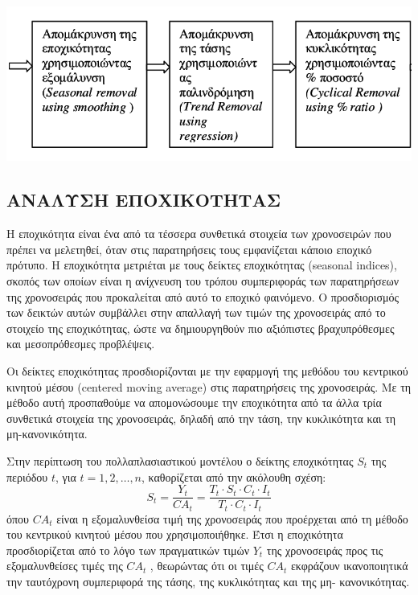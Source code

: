 \begin{center}
\includegraphics[scale=0.5]{graf19.png}\\   
\end{center} 
\subsection{ΑΝΑΛΥΣΗ ΕΠΟΧΙΚΟΤΗΤΑΣ }
Η εποχικότητα είναι ένα από τα τέσσερα συνθετικά στοιχεία των χρονοσειρών
που πρέπει να μελετηθεί, όταν στις παρατηρήσεις τους εμφανίζεται κάποιο εποχικό
πρότυπο. Η εποχικότητα μετριέται με τους δείκτες εποχικότητας (seasonal indices),
σκοπός των οποίων είναι η ανίχνευση του τρόπου συμπεριφοράς των παρατηρήσεων
της χρονοσειράς που προκαλείται από αυτό το εποχικό φαινόμενο. Ο προσδιορισμός
των δεικτών αυτών συμβάλλει στην απαλλαγή των τιμών της χρονοσειράς από το
στοιχείο της εποχικότητας, ώστε να δημιουργηθούν πιο αξιόπιστες βραχυπρόθεσμες
και μεσοπρόθεσμες προβλέψεις.

Οι δείκτες εποχικότητας προσδιορίζονται με την εφαρμογή της μεθόδου του
κεντρικού κινητού μέσου (centered moving average) στις παρατηρήσεις της
χρονοσειράς. Με τη μέθοδο αυτή προσπαθούμε να απομονώσουμε την εποχικότητα
από τα άλλα τρία συνθετικά στοιχεία της χρονοσειράς, δηλαδή από την τάση, την
κυκλικότητα και τη μη-κανονικότητα.

Στην περίπτωση του πολλαπλασιαστικού μοντέλου ο δείκτης εποχικότητας $S_t$ της
περιόδου $t$, για $t = 1, 2,\ldots, n$, καθορίζεται από την ακόλουθη σχέση:
$$ S_t=\frac{Y_t}{CA_t}=\frac{T_t\cdot S_t \cdot C_t \cdot I_t}{T_t \cdot C_t \cdot I_t} $$
όπου $CA_t$ είναι η εξομαλυνθείσα τιμή της χρονοσειράς που προέρχεται από τη μέθοδο
του κεντρικού κινητού μέσου που χρησιμοποιήθηκε. Έτσι η εποχικότητα
προσδιορίζεται από το λόγο των πραγματικών τιμών $Y_t$ της χρονοσειράς προς τις
εξομαλυνθείσες τιμές της $CA_t$ , θεωρώντας ότι οι τιμές $CA_t$ εκφράζουν ικανοποιητικά
την ταυτόχρονη συμπεριφορά της τάσης, της κυκλικότητας και της μη-
κανονικότητας.

